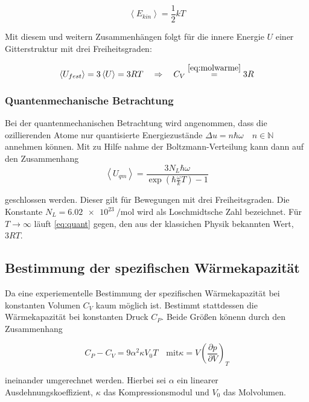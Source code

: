 \begin{equation*}
\left< E_{kin} \right>=\frac{1}{2}kT
\end{equation*} 

Mit diesem und weitern Zusammenhängen folgt für die innere Energie $U$ 
einer Gitterstruktur mit drei Freiheitsgraden:

\begin{equation*}
\left< U_{fest} \right> = 3 \left< U \right>=3RT \quad \Rightarrow \quad C_{V}\overset{\eqref{eq:molwarme}}{=}3R
\end{equation*}

\subsubsection{Quantenmechanische Betrachtung}
Bei der quantenmechanischen Betrachtung wird angenommen, 
dass die ozillierenden Atome nur quantisierte Energiezustände $\Delta u=n\hbar \omega \quad n\in\mathbb{N}$
annehmen können.
Mit zu Hilfe nahme der Boltzmann-Verteilung kann dann auf den Zusammenhang 
\begin{equation}
\label{eq:quant}
\left< U_{qm} \right> =\frac{3N_L \hbar \omega}{\exp\left(\hbar \frac{\omega}{k} T\right) -1}
\end{equation}

geschlossen werden. Dieser gilt für Bewegungen mit drei Freiheitsgraden.
Die Konstante $N_L = \SI{6.02e23}{\per\mol}$ wird als Loschmidtsche Zahl bezeichnet.
Für $T\to\infty$ läuft \eqref{eq:quant} gegen, den aus der klassichen Physik bekannten Wert, 
$3RT$.

\subsection{Bestimmung der spezifischen Wärmekapazität}
Da eine experiementelle Bestimmung der spezifischen Wärmekapazität 
bei konstanten Volumen $C_V$ kaum möglich ist.
Bestimmt stattdessen die Wärmekapazität bei konstanten Druck $C_P$.
Beide Größen könenn durch den Zusammenhang

\begin{equation}
\label{eq:umrechnung_cp_cv}
C_P-C_V=9\alpha^2\kappa V_0 T \quad \text{mit} \kappa=V\left(\frac{\partial p}{\partial V}\right)_T
\end{equation}

ineinander umgerechnet werden.
Hierbei sei $\alpha$ ein linearer Ausdehnungskoeffizient, $\kappa$ das Kompressionsmodul und
$V_0$ das Molvolumen.

